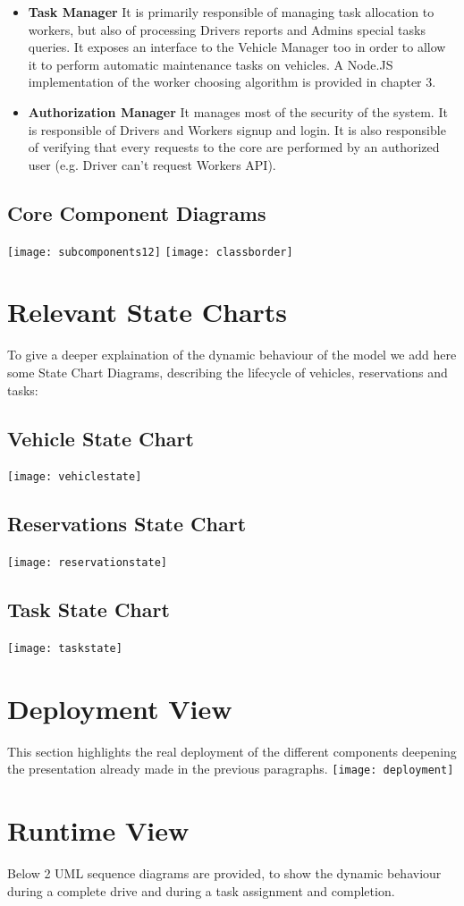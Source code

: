 \begin{itemize}
\item \textbf{Task Manager} It is primarily responsible of managing task allocation to workers, but also of processing Drivers reports and Admins special tasks queries. It exposes an interface to the Vehicle Manager too in order to allow it to perform automatic maintenance tasks on vehicles. A Node.JS implementation of the worker choosing algorithm is provided in chapter 3.
\item \textbf{Authorization Manager} It manages most of the security of the system. It is responsible of Drivers and Workers signup and login. It is also responsible of verifying that every requests to the core are performed by an authorized user (e.g. Driver can't request Workers API). 
\end{itemize}
\subsection{Core Component Diagrams}
\texttt{[image: subcomponents12]}
\texttt{[image: classborder]}
\newpage
\section{Relevant State Charts}
To give a deeper explaination of the dynamic behaviour of the model we add here some State Chart Diagrams, describing the lifecycle of vehicles, reservations and tasks:
\subsection{Vehicle State Chart}
\texttt{[image: vehiclestate]}
\subsection{Reservations State Chart}
\texttt{[image: reservationstate]}
\subsection{Task State Chart}
\texttt{[image: taskstate]}
\newpage
\section{Deployment View}
This section highlights the real deployment of the different components deepening the presentation already made in the previous paragraphs.
\texttt{[image: deployment]}
\newpage
\section{Runtime View}
Below 2 UML sequence diagrams are provided, to show the dynamic behaviour during a complete drive and during a task assignment and completion.
